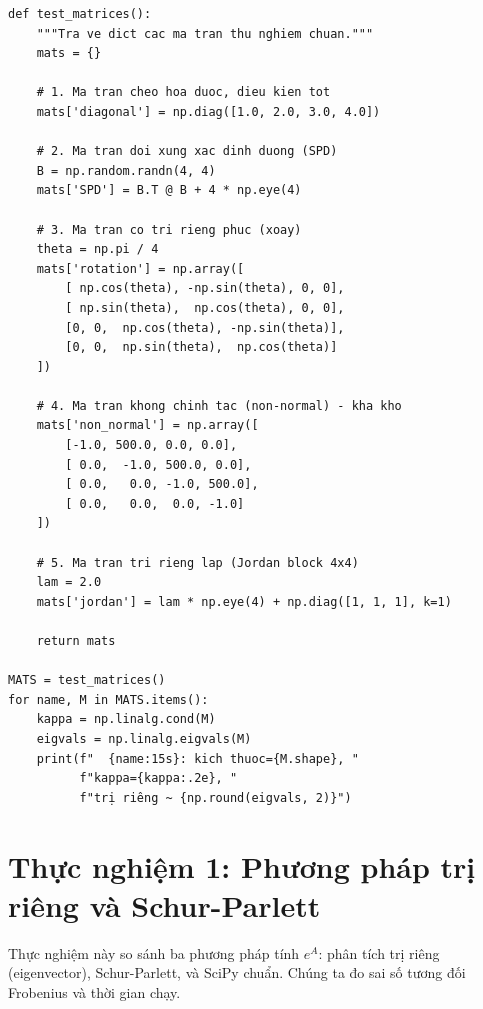 \documentclass[12pt,a4paper]{report}
\begin{document}
\begin{lstlisting}[style=python, caption={Định nghĩa các ma trận thử nghiệm}]
def test_matrices():
    """Tra ve dict cac ma tran thu nghiem chuan."""
    mats = {}

    # 1. Ma tran cheo hoa duoc, dieu kien tot
    mats['diagonal'] = np.diag([1.0, 2.0, 3.0, 4.0])

    # 2. Ma tran doi xung xac dinh duong (SPD)
    B = np.random.randn(4, 4)
    mats['SPD'] = B.T @ B + 4 * np.eye(4)

    # 3. Ma tran co tri rieng phuc (xoay)
    theta = np.pi / 4
    mats['rotation'] = np.array([
        [ np.cos(theta), -np.sin(theta), 0, 0],
        [ np.sin(theta),  np.cos(theta), 0, 0],
        [0, 0,  np.cos(theta), -np.sin(theta)],
        [0, 0,  np.sin(theta),  np.cos(theta)]
    ])

    # 4. Ma tran khong chinh tac (non-normal) - kha kho
    mats['non_normal'] = np.array([
        [-1.0, 500.0, 0.0, 0.0],
        [ 0.0,  -1.0, 500.0, 0.0],
        [ 0.0,   0.0, -1.0, 500.0],
        [ 0.0,   0.0,  0.0, -1.0]
    ])

    # 5. Ma tran tri rieng lap (Jordan block 4x4)
    lam = 2.0
    mats['jordan'] = lam * np.eye(4) + np.diag([1, 1, 1], k=1)

    return mats

MATS = test_matrices()
for name, M in MATS.items():
    kappa = np.linalg.cond(M)
    eigvals = np.linalg.eigvals(M)
    print(f"  {name:15s}: kich thuoc={M.shape}, "
          f"kappa={kappa:.2e}, "
          f"trị riêng ~ {np.round(eigvals, 2)}")
\end{lstlisting}

\section{Thực nghiệm 1: Phương pháp trị riêng và Schur-Parlett}

Thực nghiệm này so sánh ba phương pháp tính $e^A$: phân tích trị riêng (eigenvector),
Schur-Parlett, và SciPy chuẩn. Chúng ta đo sai số tương đối Frobenius và thời gian chạy.
\end{document}
